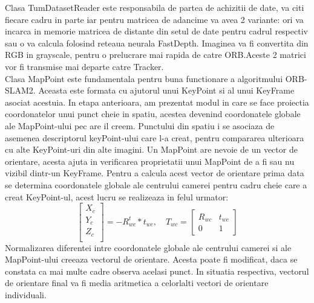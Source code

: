 \documentclass[12pt,a4paper]{report}
\begin{document}
Clasa TumDatasetReader este responsabila de partea de achizitii de date, va citi fiecare 
cadru in parte iar pentru matricea de adancime va avea 2 variante: ori va incarca in memorie 
matricea de distante din setul de date pentru cadrul respectiv sau o va calcula folosind 
reteaua neurala FastDepth. Imaginea va fi convertita din RGB in grayscale, pentru o 
prelucrare mai rapida de catre ORB.\@ Aceste 2 matrici vor fi transmise mai departe 
catre Tracker. \\
Clasa MapPoint este fundamentala pentru buna functionare a algoritmului ORB-SLAM2. Aceasta este 
formata cu ajutorul unui KeyPoint si al unui KeyFrame asociat acestuia. In etapa anterioara, 
am prezentat modul in care se face proiectia coordonatelor unui punct cheie in spatiu, acestea 
devenind coordonatele globale ale MapPoint-ului pec are il creem. Punctului din spatiu 
i se asociaza de asemenea descriptorul keyPoint-ului care l-a creat, pentru compararea ulterioara 
cu alte KeyPoint-uri din alte imagini. Un MapPoint are nevoie de un vector de orientare, acesta 
ajuta in verificarea proprietatii unui MapPoint de a fi sau nu vizibil dintr-un KeyFrame. Pentru a 
calcula acest vector de orientare prima data se determina coordonatele globale ale centrului camerei
pentru cadru cheie care a creat KeyPoint-ul, acest lucru se realizeaza in felul urmator:
\begin{equation}
    \begin{bmatrix}
        X_{c} \\
        Y_{c} \\
        Z_{c} \\
        \end{bmatrix} = -R_{wc}^t * t_{wc}, \quad{}  
        T_{wc} =     
     \begin{bmatrix}
            R_{wc} & t_{wc} \\
            0 & 1
        \end{bmatrix}
\end{equation} 
Normalizarea diferentei intre coordonatele globale ale centrului camerei si ale MapPoint-ului creeaza
vectorul de orientare. Acesta poate fi modificat, daca se constata ca mai multe cadre observa acelasi
punct. In situatia respectiva, vectorul de orientare final va fi media aritmetica a celorlalti vectori 
de orientare individuali.
\end{document}
